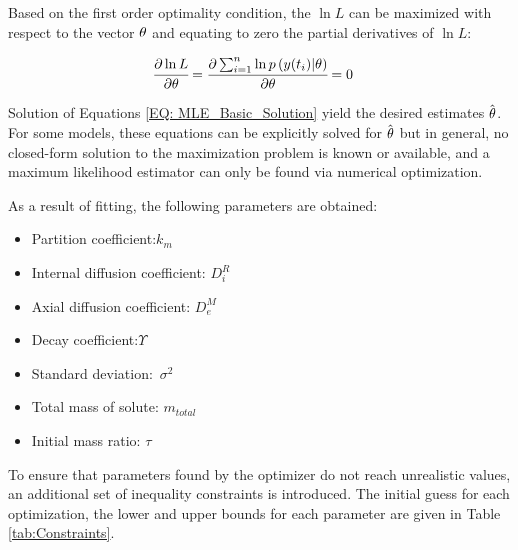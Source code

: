 \documentclass[../Article_Design_of_Experiment.tex]{subfiles}
\begin{document}
	Based on the first order optimality condition, the $\ln L$ can be maximized with respect to the vector ${\color{black} \theta}$ and equating to zero the partial derivatives of $\ln L$:
	
	{\footnotesize
		\begin{align}\label{EQ: MLE_Basic_Solution}
			\cfrac{\partial \ln L}{\partial {\color{black} \theta}} &= \cfrac{\partial \sum_{i=1}^{n} \ln p\left( {\color{black}y}(t_i) | {\color{black} \theta} \right) }{\partial {\color{black} \theta}} = 0 
	\end{align} }
	
	Solution of Equations \ref{EQ: MLE_Basic_Solution} yield the desired estimates $\hat{{\color{black} \theta}}$. For some models, these equations can be explicitly solved for $\hat{{\color{black} \theta}}$ but in general, no closed-form solution to the maximization problem is known or available, and a maximum likelihood estimator can only be found via numerical optimization.
	
	As a result of fitting, the following parameters are obtained:
	
	\begin{itemize}
		\item Partition coefficient:\qquad\quad\qquad$k_m$
		\item Internal diffusion coefficient: \quad$D_i^R$
		\item Axial diffusion coefficient: \qquad$D_e^M$
		\item Decay coefficient:\qquad\qquad\qquad$\Upsilon$
		\item Standard deviation:\qquad\qquad\quad~$\sigma^2$
		\item Total mass of solute: \qquad\quad\quad$m_{total}$
		\item Initial mass ratio: \qquad\qquad\qquad$\tau$
	\end{itemize}
	
	To ensure that parameters found by the optimizer do not reach unrealistic values, an additional set of inequality constraints is introduced. The initial guess for each optimization, the lower and upper bounds for each parameter are given in Table \ref{tab:Constraints}. 
 	
 	\begin{table}[h]
		\caption{Constraints and initial guess}
		\label{tab:Constraints}
	\end{table}
	
\end{document}
